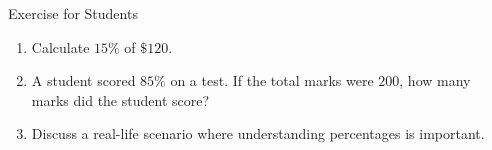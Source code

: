 \begin{frame}{Exercise for Students}
  \begin{enumerate}
    \item Calculate $15\%$ of $\$120$.
    \item A student scored $85\%$ on a test. If the total marks were $200$, how many marks did the student score?
    \item Discuss a real-life scenario where understanding percentages is important.
  \end{enumerate}
\end{frame}

